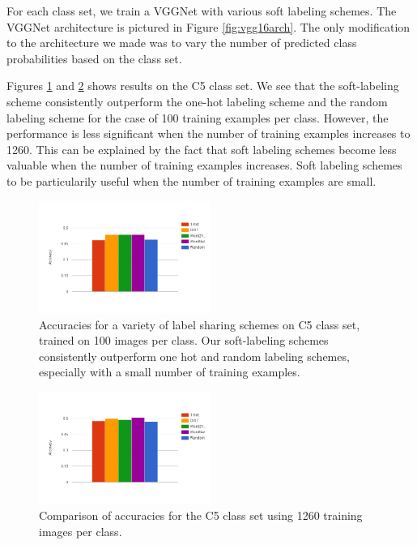 For each class set, we train a VGGNet with various soft labeling schemes. The
VGGNet architecture is pictured in Figure \ref{fig:vgg16arch}. The only
modification to the architecture we made was to vary the number of predicted
class probabilities based on the class set.

Figures \ref{fig:5_1-train_100} and \ref{fig:5_1-train_1260} shows results on
the C5 class set. We see that the soft-labeling scheme consistently outperform
the one-hot labeling scheme and the random labeling scheme for the case of 100
training examples per class. However, the performance is less significant when
the number of training examples increases to 1260. This can be explained by the
fact that soft labeling schemes become less valuable when the number of training
examples increases. Soft labeling schemes to be particularily useful when the
number of training examples are small.

\begin{figure}[!tb]
  \centering
  \includegraphics[width=0.5\textwidth]{figs/5_1-train_100.png}
  \caption{
      Accuracies for a variety of label sharing schemes on C5 class set,
      trained on 100 images per class. Our soft-labeling schemes consistently
      outperform one hot and random labeling schemes, especially with a small
      number of training examples.
  }
  \label{fig:5_1-train_100}
\end{figure}

\begin{figure}[!tb]
  \centering
  \includegraphics[width=0.5\textwidth]{figs/5_1-train_1260.png}
  \caption{
      Comparison of accuracies for the C5 class set using 1260 training images
      per class.
  }
  \label{fig:5_1-train_1260}
\end{figure}

